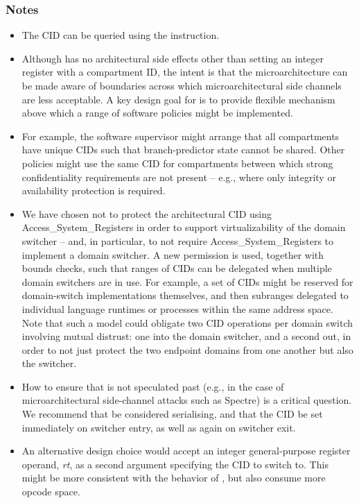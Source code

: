 \subsubsection*{Notes}

\begin{itemize}
\item
  The CID can be queried using the  instruction.
\item
  Although  has no architectural side effects other than
  setting an integer register with a compartment ID, the intent is that the
  microarchitecture can be made aware of boundaries across which
  microarchitectural side channels are less acceptable.
  A key design goal for  is to provide flexible
  mechanism above which a range of software policies might be implemented.
\item
  For example, the software supervisor might arrange that all compartments
  have unique CIDs such that branch-predictor state cannot be shared.
  Other policies might use the same CID for compartments between which strong
  confidentiality requirements are not present -- e.g., where only integrity
  or availability protection is required.
\item
  We have chosen not to protect the architectural CID using
  Access\_System\_Registers in order to support virtualizability of the domain
  switcher -- and, in particular, to not require Access\_System\_Registers to
  implement a domain switcher.
  A new permission is used, together with bounds checks, such that ranges of
  CIDs can be delegated when multiple domain switchers are in use.
  For example, a set of CIDs might be reserved for domain-switch
  implementations themselves, and then subranges delegated to individual
  language runtimes or processes within the same address space.
  Note that such a model could obligate two CID operations per domain switch
  involving mutual distrust: one into the domain switcher, and a second out,
  in order to not just protect the two endpoint domains from one another but
  also the switcher.
\item
  How to ensure that  is not speculated past (e.g., in
  the case of microarchitectural side-channel attacks such as Spectre) is a
  critical question.
  We recommend that  be considered serialising, and that
  the CID be set immediately on switcher entry, as well as again on switcher
  exit.
\item
  An alternative design choice would accept an integer general-purpose
  register operand, \emph{rt}, as a second argument specifying the CID to
  switch to.
  This might be more consistent with the behavior of ,
  but also consume more opcode space.
\end{itemize}
